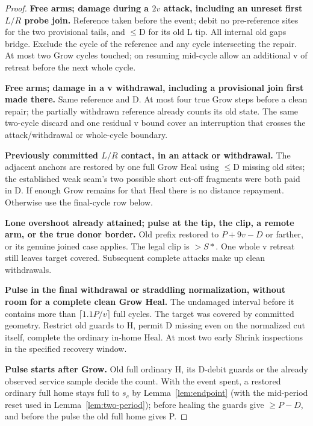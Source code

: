 \begin{proof}
\medskip\noindent\textbf{Free arms; damage during a \(2v\) attack, including an unreset first \(L/R\) probe join.} Reference taken before the event; debit no pre-reference sites for the two provisional tails, and \(\le\)D for its old L tip. All internal old gaps bridge. Exclude the cycle of the reference and any cycle intersecting the repair. At most two Grow cycles touched; on resuming mid-cycle allow an additional v of retreat before the next whole cycle.

\medskip\noindent\textbf{Free arms; damage in a v withdrawal, including a provisional join first made there.} Same reference and D. At most four true Grow steps before a clean repair; the partially withdrawn reference already counts its old state. The same two-cycle discard and one residual v bound cover an interruption that crosses the attack/withdrawal or whole-cycle boundary.

\medskip\noindent\textbf{Previously committed \(L/R\) contact, in an attack or withdrawal.} The adjacent anchors are restored by one full Grow Heal using \(\le\)D missing old sites; the established weak seam's two possible short cut-off fragments were both paid in D. If enough Grow remains for that Heal there is no distance repayment. Otherwise use the final-cycle row below.

\medskip\noindent\textbf{Lone overshoot already attained; pulse at the tip, the clip, a remote arm, or the true donor border.} Old prefix restored to \(P+9v- D\) or farther, or its genuine joined case applies. The legal clip is \(>S*\). One whole v retreat still leaves target covered. Subsequent complete attacks make up clean withdrawals.

\medskip\noindent\textbf{Pulse in the final withdrawal or straddling normalization, without room for a complete clean Grow Heal.} The undamaged interval before it contains more than \(\lceil 1.1P/v \rceil \) full cycles. The target was covered by committed geometry. Restrict old guards to H, permit D missing even on the normalized cut itself, complete the ordinary in-home Heal. At most two early Shrink inspections in the specified recovery window.

\medskip\noindent\textbf{Pulse starts after Grow.} Old full ordinary H, its D-debit guards or the already observed service sample decide the count. With the event spent, a restored ordinary full home stays full to \(s_c\) by Lemma~\ref{lem:endpoint} (with the mid-period reset used in Lemma~\ref{lem:two-period}); before healing the guards give \(\ge P-D\), and before the pulse the old full home gives P.



\end{proof}
